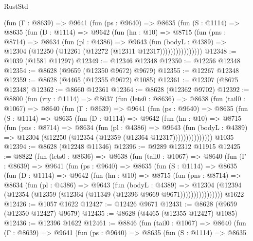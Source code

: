 \begin{lexlean}{RustStd}
\begin{coremodule}
            (fun (Γ : @8639) =>
            @9641
              (fun (ps : @9640) =>
              @8635
                (fun (S : @1114) =>
                @8635
                  (fun (D : @1114) =>
                  @9642
                    (fun (hn : @10) =>
                    @8715
                      (fun (pns : @8714) =>
                      @8634
                        (fun (pl : @4386) =>
                        @9643
                          (fun (bodyL : @4389) =>
                          @12304 (@12250 (@12261 (@12272 (@12311 @12317))))))))))))))))
@12348 := @1039 (@1581 @11297)
@12349 := @12346 @12348
@12350 := @12256 @12348
@12354 := @8628 (@9659 (@12350 @9672) @9679)
@12355 := @12267 @12348
@12359 := @8628 (@4465 (@12355 @9672) @1085)
@12361 := @12307 (@8675 @12348)
@12362 := @8660 @12361
@12364 := @8628 (@12362 @9702)
@12392 := @8800
    (fun (rty : @1114) =>
    @8637
      (fun (lets0 : @8636) =>
      @8638
        (fun (tail0 : @1067) =>
        @8640
          (fun (Γ : @8639) =>
          @9641
            (fun (ps : @9640) =>
            @8635
              (fun (S : @1114) =>
              @8635
                (fun (D : @1114) =>
                @9642
                  (fun (hn : @10) =>
                  @8715
                    (fun (pns : @8714) =>
                    @8634
                      (fun (pl : @4386) =>
                      @9643
                        (fun (bodyL : @4389) =>
                        @12304 (@12250 (@12354 (@12359 (@12364 @12317)))))))))))))))
    @1035
@12394 := @8628 (@12248 @11346)
@12396 := @9289 @12312 @11915
@12425 := @8822
    (fun (lets0 : @8636) =>
    @8638
      (fun (tail0 : @1067) =>
      @8640
        (fun (Γ : @8639) =>
        @9641
          (fun (ps : @9640) =>
          @8635
            (fun (S : @1114) =>
            @8635
              (fun (D : @1114) =>
              @9642
                (fun (hn : @10) =>
                @8715
                  (fun (pns : @8714) =>
                  @8634
                    (fun (pl : @4386) =>
                    @9643
                      (fun (bodyL : @4389) =>
                      @12304
                        (@12394 (@12354 (@12359 (@12364 (@11349 (@12396 @9669 @9671))))))))))))))))
    @1622
@12426 := @1057 @1622
@12427 := @12426 @9671
@12431 := @8628 (@9659 (@12350 @12427) @9679)
@12435 := @8628 (@4465 (@12355 @12427) @1085)
@12436 := @12396 @1622
@12461 := @8846
    (fun (tail0 : @1067) =>
    @8640
      (fun (Γ : @8639) =>
      @9641
        (fun (ps : @9640) =>
        @8635
          (fun (S : @1114) =>
          @8635

\end{coremodule}
\end{lexlean}
